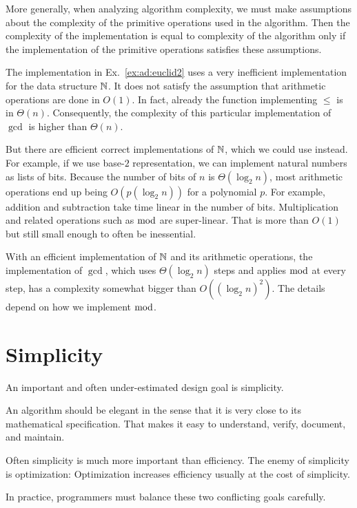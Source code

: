 More generally, when analyzing algorithm complexity, we must make assumptions about the complexity of the primitive operations used in the algorithm.
Then the complexity of the implementation is equal to complexity of the algorithm only if the implementation of the primitive operations satisfies these assumptions.

\begin{example}\label{ex:ad:euclid3}
The implementation in Ex.~\ref{ex:ad:euclid2} uses a very inefficient implementation for the data structure $\mathbb{N}$.
It does not satisfy the assumption that arithmetic operations are done in $O(1)$.
In fact, already the function implementing $\leq$ is in $\Theta(n)$.
Consequently, the complexity of this particular implementation of $\gcd$ is higher than $\Theta(n)$.
\medskip

But there are efficient correct implementations of $\mathbb{N}$, which we could use instead.
For example, if we use base-$2$ representation, we can implement natural numbers as lists of bits.
Because the number of bits of $n$ is $\Theta(\log_2 n)$, most arithmetic operations end up being $O(p(\log_2 n))$ for a polynomial $p$.
For example, addition and subtraction take time linear in the number of bits.
Multiplication and related operations such as $\mathop{\mathrm{mod}}$ are super-linear.
That is more than $O(1)$ but still small enough to often be inessential.

With an efficient implementation of $\mathbb{N}$ and its arithmetic operations, the implementation of $\gcd$, which uses $\Theta(\log_2 n)$ steps and applies $\mathop{\mathrm{mod}}$ at every step, has a complexity somewhat bigger than $O((\log_2 n)^2)$.
The details depend on how we implement $\mathop{\mathrm{mod}}$.
\end{example}

\section{Simplicity}

An important and often under-estimated design goal is simplicity.

An algorithm should be elegant in the sense that it is very close to its mathematical specification.
That makes it easy to understand, verify, document, and maintain.

Often simplicity is much more important than efficiency.
The enemy of simplicity is optimization: Optimization increases efficiency usually at the cost of simplicity.
\medskip

In practice, programmers must balance these two conflicting goals carefully.

